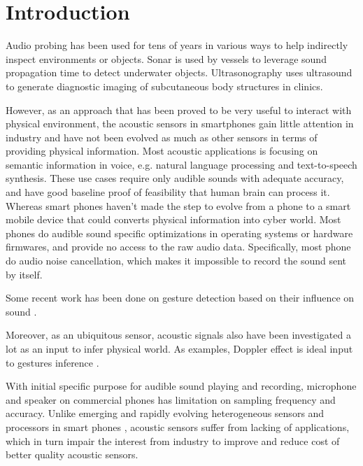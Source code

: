 \section{Introduction}
\label{sec:intro}

Audio probing has been used for tens of years in various ways to help indirectly
inspect environments or objects. Sonar is used by vessels to leverage sound propagation 
time to detect underwater objects. Ultrasonography uses ultrasound to generate
diagnostic imaging of subcutaneous body structures in clinics. 


However, as an approach that has been proved to be very useful to interact with 
physical environment, the acoustic sensors in smartphones gain little attention in 
industry and 
have not been evolved as much as other sensors in terms of providing physical information.
Most acoustic applications is focusing on semantic information in voice, e.g. natural 
language processing and text-to-speech synthesis. These use cases require only audible
sounds with adequate 
accuracy, and have good baseline proof of feasibility that human brain can process it. 
Whereas smart phones haven't made the step to evolve from a phone to a smart 
mobile device that could converts physical information into cyber world. 
Most phones do audible sound specific optimizations in operating systems or 
hardware firmwares, and provide no access to the raw audio data. Specifically, most phone
do audio noise cancellation, which makes it impossible to record the sound sent by itself.


Some recent work has been done on gesture detection based on their influence on sound 
. 

Moreover, 
as an ubiquitous sensor, acoustic signals also have been investigated a lot as 
an input to infer physical world. As examples, Doppler effect is ideal input to 
gestures inference \cite{gupta2012soundwave, sun2013spartacus}.


With initial specific purpose for audible sound playing and recording, microphone 
and speaker on commercial phones has limitation on sampling frequency and accuracy. 
Unlike emerging and rapidly evolving heterogeneous sensors and processors in 
smart phones \cite{invensense, applem7}, acoustic sensors suffer from lacking of 
applications, which in turn impair the interest from industry to improve and reduce
cost of better quality acoustic sensors.






